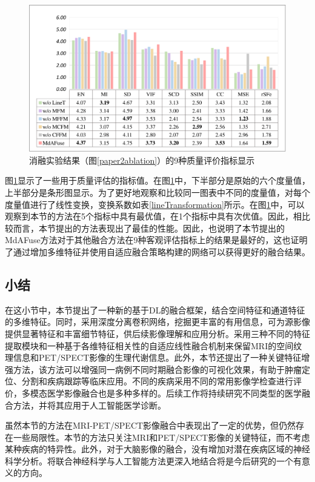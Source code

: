   \begin{figure}[htbp]
      \centering
      \includegraphics[width=0.9\columnwidth]{figs/paper2ablation2024_value1.pdf}
      \caption{消融实验结果（图\ref{paper2ablation}）的9种质量评价指标显示}\label{paper2ablation_value1}
    \end{figure}
    
图\ref{paper2ablation_value1}显示了一些用于质量评估的指标值。在图\ref{paper2ablation_value1}中，下半部分是原始的六个度量值，上半部分是条形图显示。为了更好地观察和比较同一图表中不同的度量值，对每个度量值进行了线性变换，变换系数如表\ref{lineTransformation}所示。在图\ref{paper2ablation_value1}中，可以观察到本节的方法在5个指标中具有最优值，在1个指标中具有次优值。因此，相比较而言，本节提出的方法表现出了最佳的性能。因此，也说明了本节提出的MdAFuse方法对于其他融合方法在9种客观评估指标上的结果是最好的，这也证明了通过增加多维特征并使用自适应融合策略构建的网络可以获得更好的融合结果。
    

\subsection{小结}
在这小节中，本节提出了一种新的基于DL的融合框架，结合空间特征和通道特征的多维特征。同时，采用深度分离卷积网络，挖掘更丰富的有用信息，可为源影像提供显著特征和丰富细节特征，供后续影像理解和应用分析。采用三种不同的特征提取模块和一种基于各维特征相关性的自适应线性融合机制来保留MRI的空间纹理信息和PET/SPECT影像的生理代谢信息。此外，本节还提出了一种关键特征增强方法，该方法可以增强同一病例不同时期融合影像的可视化效果，有助于肿瘤定位、分割和疾病跟踪等临床应用。不同的疾病采用不同的常用影像学检查进行评价，多模态医学影像融合也是多种多样的。后续工作将持续研究不同类型的医学融合方法，并将其应用于人工智能医学诊断。

虽然本节的方法在MRI-PET/SPECT影像融合中表现出了一定的优势，但仍然存在一些局限性。本节的方法只关注MRI和PET/SPECT影像的关键特征，而不考虑某种疾病的特异性。此外，对于大脑影像的融合，没有增加对潜在疾病区域的神经科学分析。将联合神经科学与人工智能方法更深入地结合将是今后研究的一个有意义的方向。


